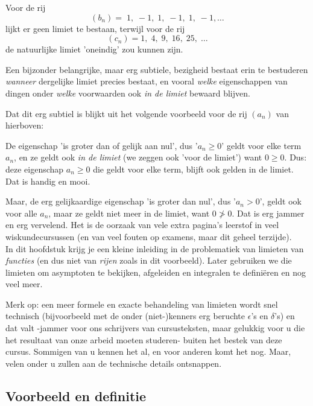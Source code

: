 \documentclass[numbers]{ximera}
\begin{document}
\begin{expandable}
\begin{uitwijding}
Voor de rij 
\[
(b_n) = \;1,\;-1,\;1,\;-1,\;1,\;-1,\dots
\]
lijkt er geen limiet te bestaan,
terwijl voor de rij 
\[
(c_n) = 1,\;4,\;9,\;16,\;25,\;\dots
\]
de natuurlijke limiet 'oneindig' zou kunnen zijn.

Een bijzonder belangrijke, maar erg subtiele, bezigheid bestaat erin te bestuderen \textit{wanneer} dergelijke limiet precies bestaat, en vooral \textit{welke} eigenschappen van dingen onder \textit{welke} voorwaarden ook \textit{in de limiet} bewaard blijven. 

Dat dit erg subtiel is blijkt uit het volgende voorbeeld voor de rij $(a_n)$ van hierboven:

De eigenschap 'is groter dan of gelijk aan nul', dus '$a_n\geq0$' geldt voor elke term $a_n$, en ze geldt ook \textit{in de limiet} (we zeggen ook 'voor de limiet') want  $0\geq0$. Dus: deze eigenschap $a_n\geq 0$ die geldt voor elke term, blijft ook gelden in de limiet. Dat is handig en mooi. 

Maar, de erg gelijkaardige eigenschap 'is groter dan nul', dus '$a_n>0$', geldt ook voor alle $a_n$, maar ze geldt niet meer in de limiet, want $0\not>0$. Dat is erg jammer en erg vervelend. Het is de oorzaak van vele extra pagina's leerstof in veel wiskundecursussen (en van veel fouten op examens, maar dit geheel terzijde). \\


In dit hoofdstuk krijg je een kleine inleiding in de problematiek van limieten van \textit{functies} (en dus niet van \textit{rijen} zoals in dit voorbeeld). Later gebruiken we die limieten om asymptoten te bekijken, afgeleiden en integralen te definiëren en nog veel meer. 

Merk op: een meer formele en exacte behandeling van limieten wordt snel technisch (bijvoorbeeld met de onder (niet-)kenners erg beruchte $\epsilon$'s en $\delta$'s)  en dat valt -jammer voor ons schrijvers van cursusteksten, maar gelukkig voor u die het resultaat van onze arbeid moeten studeren- buiten het bestek van deze cursus. Sommigen van u kennen het al, en voor anderen komt het nog. Maar, velen onder u zullen aan de technische details ontsnappen.
\end{uitwijding}
\end{expandable}


\subsection{Voorbeeld en definitie}
\end{document}
